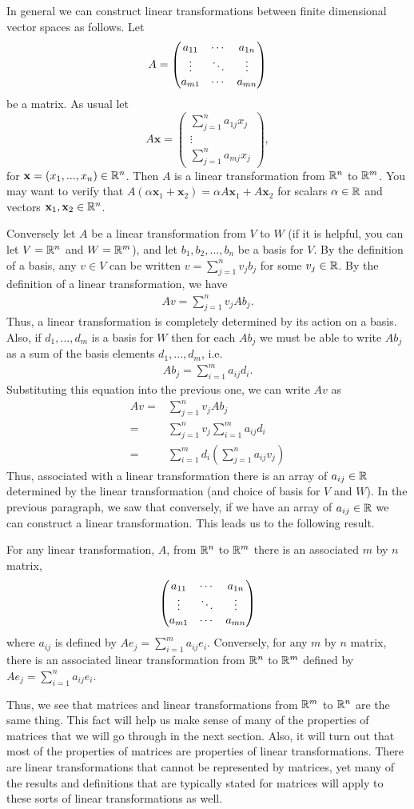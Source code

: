In general we can construct linear transformations between finite
dimensional vector spaces as follows. Let 
\[ A = \begin{pmatrix} {a}_{11} & \cdots & {a}_{1n} \\ \vdots & \ddots & \vdots \\ {a}_{m1} & \cdots & {a}_{mn} \end{pmatrix} \]
be a matrix. As usual let 
\[ A\mathbf{x} = 
\begin{pmatrix} 
  \sum_{j=1}^n a_{1j} x_j \\
  \vdots \\
  \sum_{j=1}^n a_{mj} x_j 
\end{pmatrix}, \] for $\mathbf{x} = (x_1, ..., x_n) \in \mathbb{R}^n$. Then
$A$ is a linear transformation from $\mathbb{R}^n$ to $\mathbb{R}^m$. You may want to
verify that $A(\alpha \mathbf{x}_1 + \mathbf{x}_2 ) = \alpha A
\mathbf{x}_1 + A \mathbf{x}_2$ for scalars $\alpha \in \mathbb{R}$ and
vectors $\mathbf{x}_1, \mathbf{x}_2 \in \mathbb{R}^n$. 

Conversely let $A$ be a linear transformation from $V$ to $W$ (if it
is helpful, you can let $V=\mathbb{R}^n$ and $W=\mathbb{R}^m$), and let $b_1, b_2,
..., b_n$ be a basis for $V$. By the definition of a basis, any $v \in
V$ can be written $v = \sum_{j=1}^n v_j b_j$ for some $v_j
\in \mathbb{R}$. By the definition of a linear transformation, we have
\begin{align*}
  A v = \sum_{j=1}^n v_j A b_j. 
\end{align*}
Thus, a linear transformation is completely determined by its action
on a basis. Also, if $d_1, ..., d_m$ is a basis for $W$ then for each
$A b_j$ we must be able to write $A b_j$ as a sum of the basis
elements $d_1, ..., d_m$, i.e.\
\begin{align*}
  A b_j = \sum_{i=1}^m a_{ij} d_i.
\end{align*}
Substituting this equation into the previous one, we can write $Av$ as
\begin{align*}
  Av = & \sum_{j=1}^n v_j A b_j \\
  = & \sum_{j=1}^n v_j \sum_{i=1}^m a_{ij} d_i \\
  = & \sum_{i=1}^m d_i \left( \sum_{j=1}^n a_{ij} v_j \right) 
\end{align*}
Thus, associated with a linear transformation there is an array of
$a_{ij} \in \mathbb{R}$ determined by the linear transformation (and choice of
basis for $V$ and $W$). In the previous paragraph, we saw that
conversely, if we have an array of $a_{ij} \in \mathbb{R}$ we can construct a
linear transformation. This leads us to the following result.
\begin{theorem}
  For any linear transformation, $A$, from $\mathbb{R}^n$ to $\mathbb{R}^m$ there is an
  associated $m$ by $n$ matrix,
  \[ 
  \begin{pmatrix} {a}_{11} & \cdots & {a}_{1n} \\ \vdots & \ddots & \vdots \\ {a}_{m1} & \cdots & {a}_{mn} \end{pmatrix}
  \]
  where $a_{ij}$ is defined by $A e_j = \sum_{i=1}^m a_{ij}
  e_i$. Conversely, for any $m$ by $n$ matrix, there is an associated
  linear transformation from $\mathbb{R}^n$ to $\mathbb{R}^m$ defined by $A e_j =
  \sum_{i=1}^n a_{ij} e_i$.
\end{theorem}
Thus, we see that matrices and linear transformations from $\mathbb{R}^m$ to
$\mathbb{R}^n$ are the same thing. This fact will help us make sense of many
of the properties of matrices that we will go through in the next
section. Also, it will turn out that most of the properties of
matrices are properties of linear transformations. There are linear
transformations that cannot be represented by matrices, yet many of
the results and definitions that are typically stated for matrices
will apply to these sorts of linear transformations as well.

